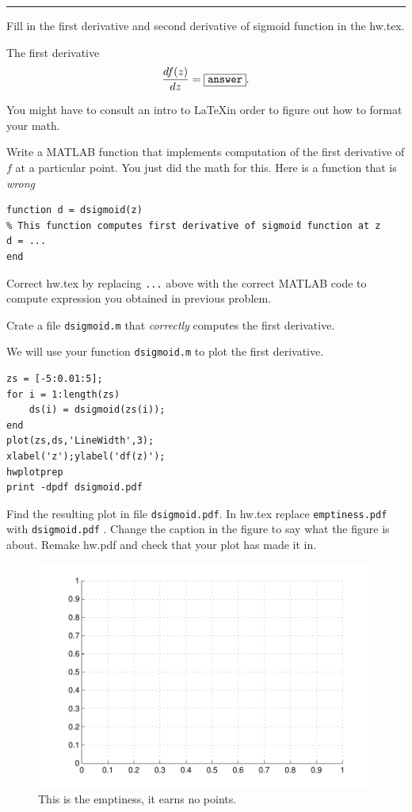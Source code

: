 \documentclass{article}
\begin{document}
\hrule

\newproblem{1pt}
Fill in the first derivative and second derivative of sigmoid function in the hw\theHW.tex.

The first derivative
\[
\frac{d f(z)}{dz} =  \answer.%
\]

You might have to consult an intro to \LaTeX in order to figure out how to format your math.

\newproblem{1pt}
Write a MATLAB function that implements computation  of the first derivative of $f$ at a particular point. You just did the math for this.
Here is a function that is {\em wrong}
\begin{verbatim}
function d = dsigmoid(z)
% This function computes first derivative of sigmoid function at z
d = ...
end
\end{verbatim}
Correct hw\theHW.tex by replacing {\tt ...} above with the correct MATLAB code to compute expression you obtained in previous problem.

Crate a file {\tt dsigmoid.m} that {\em correctly} computes the first derivative.

\newproblem{1pt}

We will use your function {\tt dsigmoid.m} to plot the first derivative.
\begin{verbatim}
zs = [-5:0.01:5];
for i = 1:length(zs)
    ds(i) = dsigmoid(zs(i));
end
plot(zs,ds,'LineWidth',3);
xlabel('z');ylabel('df(z)');
hwplotprep
print -dpdf dsigmoid.pdf
\end{verbatim}

Find the resulting plot in file {\tt dsigmoid.pdf}. In hw\theHW.tex replace {\tt emptiness.pdf} with {\tt dsigmoid.pdf} . Change the
caption in the figure to say what the figure is about. Remake hw\theHW.pdf and check that your plot has made it in.
\begin{figure}[H]
\begin{center}
\includegraphics[scale=0.5]{emptiness.pdf}
\caption{This is the emptiness, it earns no points.}
\end{center}
\end{figure}
\end{document}
